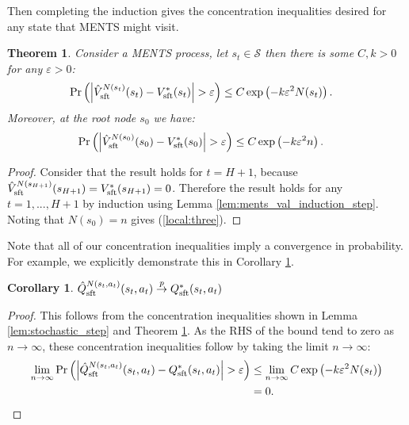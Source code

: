 \documentclass{article}
\newcommand{\cl}[1]{\mathcal{#1}}
\newcommand{\Vst}[2]{\hat{V}^{#2}_{\textnormal{sft}}(#1)}
\newcommand{\Vss}[1]{V^*_{\textnormal{sft}}(#1)}
\newcommand{\Qst}[3]{\hat{Q}^{#3}_{\textnormal{sft}}(#1,#2)}
\newcommand{\Qss}[2]{Q^*_{\textnormal{sft}}(#1,#2)}
\newcommand{\rap}{\overset{p}{\to}}
\theoremstyle{plain}
\newtheorem{theorem}{Theorem}[section]
\newtheorem{corollary}{Corollary}[theorem]
\begin{document}
\begin{appendices}
        Then completing the induction gives the concentration inequalities desired for any state that MENTS might visit.
        \begin{theorem} \label{thrm:ments_val_converge}
            Consider a MENTS process, let $s_t\in\cl{S}$ then there is some $C,k>0$ for any $\varepsilon>0$:
            \begin{align}
                \Pr\left(\left| \Vst{s_{t}}{N(s_{t})} - \Vss{s_{t}} \right| > \varepsilon \right) 
                    &\leq C\exp\left( -k\varepsilon^2 N(s_{t}) \right).
            \end{align}
            Moreover, at the root node $s_0$ we have:
            \begin{align}
                \Pr\left(\left| \Vst{s_{0}}{N(s_{0})} - \Vss{s_{0}} \right| > \varepsilon \right) 
                    &\leq C\exp\left( -k\varepsilon^2 n \right). \label{local:three}
            \end{align}
        \end{theorem}
        \begin{proof}
            Consider that the result holds for $t=H+1$, because $\Vst{s_{H+1}}{N(s_{H+1})}=\Vss{s_{H+1}}=0$. Therefore the result holds for any $t=1,...,H+1$ by induction using Lemma \ref{lem:ments_val_induction_step}. Noting that $N(s_0)=n$ gives (\ref{local:three}).
        \end{proof}
        
        
        
        
        
        Note that all of our concentration inequalities imply a convergence in probability. For example, we explicitly demonstrate this in Corollary \ref{cor:sftq_convg}.
        
        \begin{corollary} \label{cor:sftq_convg}
        		$\Qst{s_t}{a_t}{N(s_{t},a_t)}\rap \Qss{s_t}{a_t}$
        \end{corollary}
        \begin{proof}
        		This follows from the concentration inequalities shown in Lemma \ref{lem:stochastic_step} and Theorem \ref{thrm:ments_val_converge}. As the RHS of the bound tend to zero as $n\rightarrow\infty$, these concentration inequalities follow by taking the limit $n\rightarrow\infty$:
        		\begin{align}	
                \lim_{n\rightarrow\infty} \Pr\left(\left| \Qst{s_{t}}{a_t}{N(s_{t},a_t)} - \Qss{s_t}{a_t} \right| > \varepsilon \right) 
                    &\leq \lim_{n\rightarrow\infty}  C\exp\left( -k\varepsilon^2 N(s_{t}) \right) \\
                    &= 0.
        		\end{align}
        	\end{proof}








\end{appendices}
\end{document}

